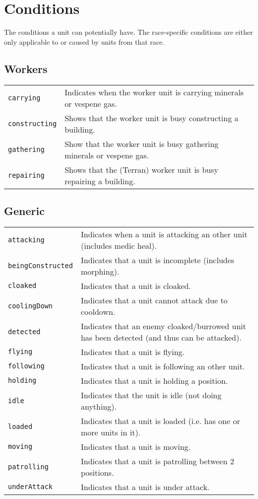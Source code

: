 \newpage
\section{Conditions}
\label{conditions}
The conditions a unit can potentially have. The race-specific conditions are either only applicable to or caused by units from that race.

\subsection{Workers}
\begin{tabularx}{\textwidth}{lX}
 \verb|carrying| & Indicates when the worker unit is carrying minerals or vespene gas. \\
 \verb|constructing| & Shows that the worker unit is busy constructing a building. \\
 \verb|gathering| & Show that the worker unit is busy gathering minerals or vespene gas. \\
 \verb|repairing| & Shows that the (Terran) worker unit is busy repairing a building.
\end{tabularx}

\subsection{Generic}
\begin{tabularx}{\textwidth}{lX}
 \verb|attacking| & Indicates when a unit is attacking an other unit (includes medic heal). \\
 \verb|beingConstructed| & Indicates that a unit is incomplete (includes morphing). \\
 \verb|cloaked| & Indicates that a unit is cloaked. \\
 \verb|coolingDown| & Indicates that a unit cannot attack due to cooldown. \\
 \verb|detected| & Indicates that an enemy cloaked/burrowed unit has been detected (and thus can be attacked). \\
 \verb|flying| & Indicates that a unit is flying. \\
 \verb|following| & Indicates that a unit is following an other unit. \\
 \verb|holding| & Indicates that a unit is holding a position. \\
 \verb|idle| & Indicates that the unit is idle (not doing anything). \\
 \verb|loaded| & Indicates that a unit is loaded (i.e. has one or more units in it). \\
 \verb|moving| & Indicates that a unit is moving. \\
 \verb|patrolling| & Indicates that a unit is patrolling between 2 positions. \\
 \verb|underAttack| & Indicates that a unit is under attack.
\end{tabularx}

